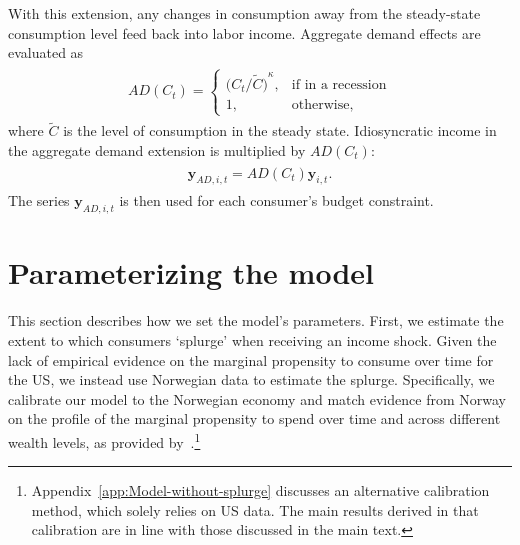 \documentclass[qe]{econsocart}
\begin{document}
With this extension, any changes in consumption away from the steady-state consumption level feed back into labor income.
Aggregate demand effects are evaluated as
\begin{equation}
  \begin{gathered}
    \begin{aligned}
      AD(C_t) =   \begin{cases}{\Big(C_t/\tilde{C}\Big)}^\kappa, & \text{if in a recession} \\
             1,                                & \text{otherwise} ,
                  \end{cases}
    \end{aligned}
  \end{gathered}
\end{equation}
where $\tilde{C}$ is the level of consumption in the steady state.
Idiosyncratic income in the aggregate demand extension is multiplied by $AD(C_t)$:
\begin{equation}
  \begin{gathered}
    \begin{aligned}
      \mathbf{y}_{AD,i,t} = AD(C_t)\mathbf{y}_{i,t}.
    \end{aligned}
  \end{gathered}
\end{equation}
The series $\mathbf{y}_{AD,i,t}$ is then used for each consumer's budget constraint.

\captionsetup[figure]{list=no}
\captionsetup[table]{list=no}

\section{Parameterizing the model}
\label{sec:parameters}

This section describes how we set the model's parameters. First, we estimate the extent to which consumers `splurge' when receiving an income shock. Given the lack of empirical evidence on the marginal propensity to consume over time for the US, we instead use Norwegian data to estimate the splurge. Specifically, we calibrate our model to the Norwegian economy and match evidence from Norway on the profile of the marginal propensity to spend over time and across different wealth levels, as provided by~\cite{fagereng-mpc-2021}.\footnote{Appendix~\ref{app:Model-without-splurge} discusses an alternative calibration method, which solely relies on US data. The main results derived in that calibration are in line with those discussed in the main text.}
\end{document}
